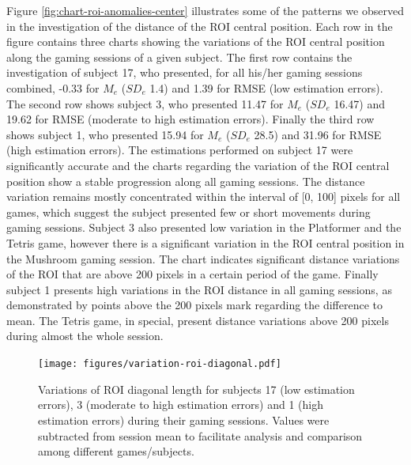 Figure \ref{fig:chart-roi-anomalies-center} illustrates some of the patterns we observed in the investigation of the distance of the ROI central position. Each row in the figure contains three charts showing the variations of the ROI central position along the gaming sessions of a given subject. The first row contains the investigation of subject 17, who presented, for all his/her gaming sessions combined, -0.33 for $M_e$ ($SD_e$ 1.4) and 1.39 for RMSE (low estimation errors). The second row shows subject 3, who presented 11.47 for $M_e$ ($SD_e$ 16.47) and 19.62 for RMSE (moderate to high estimation errors). Finally the third row shows subject 1, who presented 15.94 for $M_e$ ($SD_e$ 28.5) and 31.96 for RMSE (high estimation errors). The estimations performed on subject 17 were significantly accurate and the charts regarding the variation of the ROI central position show a stable progression along all gaming sessions. The distance variation remains mostly concentrated within the interval of [0, 100] pixels for all games, which suggest the subject presented few or short movements during gaming sessions. Subject 3 also presented low variation in the Platformer and the Tetris game, however there is a significant variation in the ROI central position in the Mushroom gaming session. The chart indicates significant distance variations of the ROI that are above 200 pixels in a certain period of the game. Finally subject 1 presents high variations in the ROI distance in all gaming sessions, as demonstrated by points above the 200 pixels mark regarding the difference to mean. The Tetris game, in special, present distance variations above 200 pixels during almost the whole session.

\begin{figure}[!t]
\centering
\texttt{[image: figures/variation-roi-diagonal.pdf]}
\caption{Variations of ROI diagonal length for subjects 17 (low estimation errors), 3 (moderate to high estimation errors) and 1 (high estimation errors) during their gaming sessions. Values were subtracted from session mean to facilitate analysis and comparison among different games/subjects.}
\label{fig:chart-roi-anomalies-diagonal}
\end{figure}

